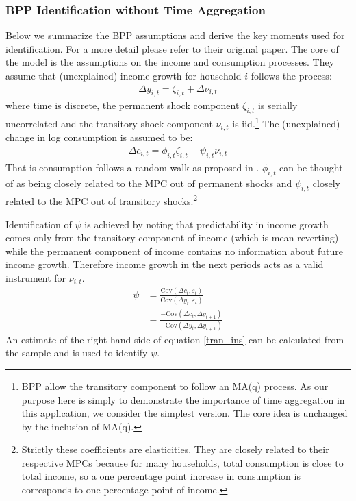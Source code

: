 \documentclass[titlepage]{\econtex}\newcommand{\texname}{IncomeUncertainty}
\begin{document}
\subsubsection{BPP Identification without Time Aggregation} \label{BPP_noagg}
Below we summarize the BPP assumptions and derive the key moments used for identification. For a more detail please refer to their original paper. The core of the model is the assumptions on the income and consumption processes. They assume that (unexplained) income growth for household $i$ follows the process:
\begin{align*}
\Delta y_{i,t} = \zeta_{i,t} + \Delta \nu_{i,t}
\end{align*}
where time is discrete, the permanent shock component $\zeta_{i,t}$ is serially uncorrelated and the transitory shock component $\nu_{i,t}$ is iid.\footnote{BPP allow the transitory component to follow an MA(q) process. As our purpose here is simply to demonstrate the importance of time aggregation in this application, we consider the simplest version. The core idea is unchanged by the inclusion of MA(q).} The (unexplained) change in log consumption is assumed to be:
\begin{align*}
\Delta c_{i,t} = \phi_{i,t}\zeta_{i,t} + \psi_{i,t} \nu_{i,t}
\end{align*}
That is consumption follows a random walk as proposed in \cite{hall_stochastic_1978}. $\phi_{i,t}$ can be thought of as being closely related to the MPC out of permanent shocks and $\psi_{i,t}$ closely related to the MPC out of transitory shocks.\footnote{Strictly these coefficients are elasticities. They are closely related to their respective MPCs because for many households, total consumption is close to total income, so a one percentage point increase in consumption is corresponds to one percentage point of income.}

Identification of $\psi$ is achieved by noting that predictability in income growth comes only from the transitory component of income (which is mean reverting) while the permanent component of income contains no information about future income growth. Therefore income growth in the next periods acts as a valid instrument for $\nu_{i,t}$.
\begin{align}
\psi &= \frac{\mathrm{Cov}(\Delta c_t,\varepsilon_t)}{\mathrm{Cov}(\Delta y_t,\varepsilon_t)} \nonumber \\
&= \frac{-\mathrm{Cov}(\Delta c_t,\Delta y_{t+1})}{-\mathrm{Cov}(\Delta y_t,\Delta y_{t+1})} \label{tran_ins}
\end{align}
An estimate of the right hand side of equation \ref{tran_ins} can be calculated from the sample and is used to identify $\psi$.
\end{document}
